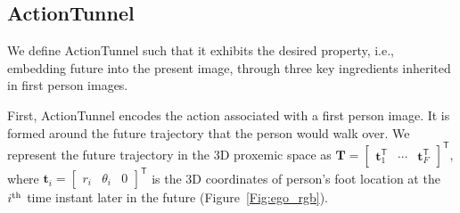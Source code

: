 \documentclass[10pt,twocolumn,letterpaper]{article}
\begin{document}




\subsection{ActionTunnel}
We define ActionTunnel such that it exhibits the desired property, i.e., embedding future into the present image, through three key ingredients inherited in first person images.

First, ActionTunnel encodes the action associated with a first person image. It is formed around the future trajectory that the person would walk over. We represent the future trajectory in the 3D proxemic space as $\textbf{T}=\left[\begin{array}{ccc} \mathbf{t}_1^{\mathsf{T}} & \cdots & \mathbf{t}_F^{\mathsf{T}}\end{array}\right]^{\mathsf{T}}$, where $\mathbf{t}_i=\left[\begin{array}{ccc} r_i & \theta_i & 0\end{array}\right]^{\mathsf{T}}$ is the 3D coordinates of person's foot location at the $i^{\rm th}$ time instant later in the future (Figure~\ref{Fig:ego_rgb}). 
\end{document}
